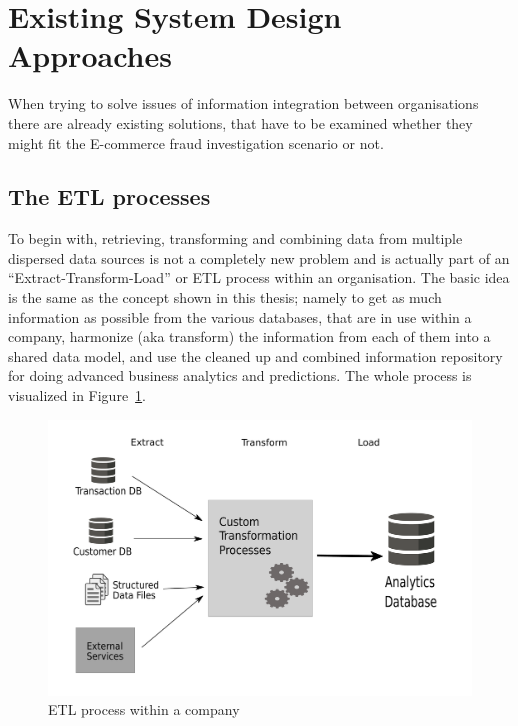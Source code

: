 
\section{Existing System Design Approaches}
\label{sec:system_approaches}

When trying to solve issues of information integration between organisations there are already existing solutions, that have to be examined whether they might fit the E-commerce fraud investigation scenario or not.

\subsection{The \gls{ETL} processes}
\label{subsec:etl_process}

To begin with, retrieving, transforming and combining data from multiple dispersed data sources is not a completely new problem and is actually part of an ``Extract-Transform-Load'' or \gls{ETL} process within an organisation. The basic idea is the same as the concept shown in this thesis; namely to get as much information as possible from the various databases, that are in use within a company, harmonize (aka transform) the information from each of them into a shared data model, and use the cleaned up and combined information repository for doing advanced business analytics and predictions. The whole process is visualized in Figure~\ref{fig:images_etl_process}. \\

\begin{figure}[!ht]
  \centering
  \includegraphics[width=0.7\columnwidth]{images/etl_process.pdf}
  \caption{\gls{ETL} process within a company \citep[pg. 165]{wood2014linked}}
\label{fig:images_etl_process}
\end{figure}


